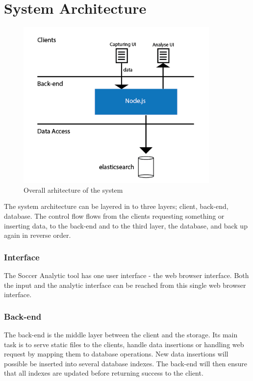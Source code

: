 

\section{System Architecture}

\begin{figure}[ht!]
\centering
\includegraphics[width=100mm]{images/general/arhitecture.png}
\caption{Overall arhitecture of the system }
\label{overflow}
\end{figure}

The system architecture can be layered in to three layers; client, back-end, database. The control flow flows from the clients requesting something or inserting data, to the back-end and to the third layer, the database, and back up again in reverse order. 



\subsubsection{Interface}

The Soccer Analytic tool has one user interface - the web browser interface. Both the input and the analytic interface can be reached from this single web browser interface.

\subsubsection{Back-end}

The back-end is the middle layer between the client and the storage. Its main task is to serve static files to the clients, handle data insertions or handling web request by mapping them to database operations. New data insertions will possible be inserted into several database indexes. The back-end will then ensure that all indexes are updated before returning success to the client.

